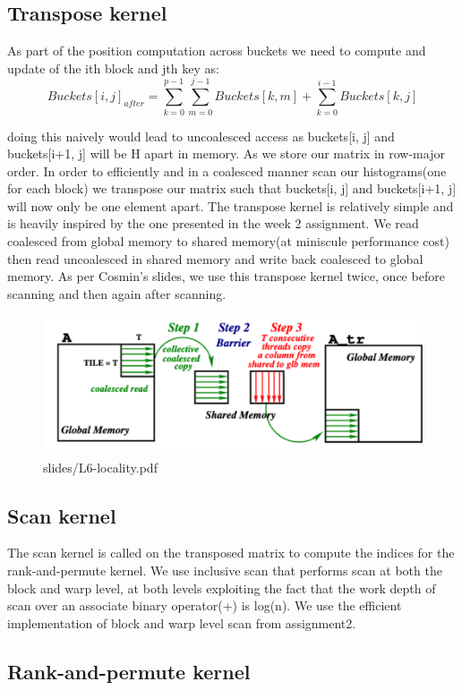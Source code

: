\documentclass{article}
\begin{document}
\subsection{Transpose kernel}

As part of the position computation across buckets we need to compute and update of the ith block and jth key as:
\[
Buckets[i,j]_{after} = \sum_{k=0}^{p-1} \sum_{m=0}^{j-1} Buckets[k,m] + \sum_{k=0}^{i-1} Buckets[k,j]
\]

doing this naively would lead to uncoalesced access as buckets[i, j] and buckets[i+1, j] will be H apart in memory. As we store our matrix in row-major order. In order to efficiently and in a coalesced manner scan our histograms(one for each block) we transpose our matrix such that buckets[i, j] and buckets[i+1, j] will now only be one element apart.
The transpose kernel is relatively simple and is heavily inspired by the one presented in the week 2 assignment. 
We read coalesced from global memory to shared memory(at miniscule performance cost) then read uncoalesced in shared memory and write back coalesced to global memory. As per Cosmin's slides, we use this transpose kernel twice, once before scanning and then again after scanning.
\begin{figure}
  \includegraphics[width=1\textwidth]{images/coalesced_transpose.png}
  \caption{slides/L6-locality.pdf}
\end{figure}


\subsection{Scan kernel}
The scan kernel is called on the transposed matrix to compute the indices for the rank-and-permute kernel. 
We use inclusive scan that performs scan at both the block and warp level, at both levels exploiting the fact that the work depth of scan over an associate binary operator(+) is log(n). We use the efficient implementation of block and warp level scan from assignment2.

\subsection{Rank-and-permute kernel}
\end{document}
